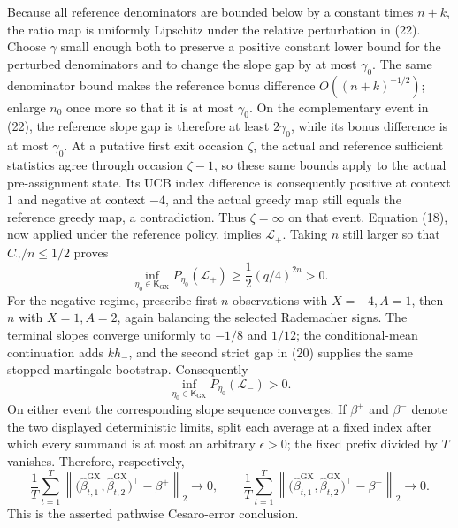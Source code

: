 Because all reference denominators are bounded below by a constant times \(n+k\), the ratio map is uniformly Lipschitz under the relative perturbation in (22).  Choose \(\gamma\) small enough both to preserve a positive constant lower bound for the perturbed denominators and to change the slope gap by at most \(\gamma_0\).  The same denominator bound makes the reference bonus difference \(O((n+k)^{-1/2})\); enlarge \(n_0\) once more so that it is at most \(\gamma_0\).  On the complementary event in (22), the reference slope gap is therefore at least \(2\gamma_0\), while its bonus difference is at most \(\gamma_0\).  At a putative first exit occasion \(\zeta\), the actual and reference sufficient statistics agree through occasion \(\zeta-1\), so these same bounds apply to the actual pre-assignment state.  Its UCB index difference is consequently positive at context \(1\) and negative at context \(-4\), and the actual greedy map still equals the reference greedy map, a contradiction.  Thus \(\zeta=\infty\) on that event.  Equation (18), now applied under the reference policy, implies \(\mathcal L_+\).  Taking \(n\) still larger so that \(C_\gamma/n\leq1/2\) proves
\[
 \inf_{\eta_0\in\mathsf K_{\mathrm{GX}}}P_{\eta_0}(\mathcal L_+)
 \geq \frac12(q/4)^{2n}>0. \tag{23}
\]
For the negative regime, prescribe first \(n\) observations with \(X=-4,A=1\), then \(n\) with \(X=1,A=2\), again balancing the selected Rademacher signs.  The terminal slopes converge uniformly to \(-1/8\) and \(1/12\); the conditional-mean continuation adds \(kh_-\), and the second strict gap in (20) supplies the same stopped-martingale bootstrap.  Consequently
\[
 \inf_{\eta_0\in\mathsf K_{\mathrm{GX}}}P_{\eta_0}(\mathcal L_-)>0. \tag{24}
\]
On either event the corresponding slope sequence converges.  If \(\beta^+\) and \(\beta^-\) denote the two displayed deterministic limits, split each average at a fixed index after which every summand is at most an arbitrary \(\epsilon>0\); the fixed prefix divided by \(T\) vanishes.  Therefore, respectively,
\[
 \frac1T\sum_{t=1}^T\left\|\bigl(\widehat\beta^{\mathrm{GX}}_{t,1},\widehat\beta^{\mathrm{GX}}_{t,2}\bigr)^\top-\beta^+\right\|_2\longrightarrow0,
 \qquad
 \frac1T\sum_{t=1}^T\left\|\bigl(\widehat\beta^{\mathrm{GX}}_{t,1},\widehat\beta^{\mathrm{GX}}_{t,2}\bigr)^\top-\beta^-\right\|_2\longrightarrow0.
\]
This is the asserted pathwise Cesaro-error conclusion.

